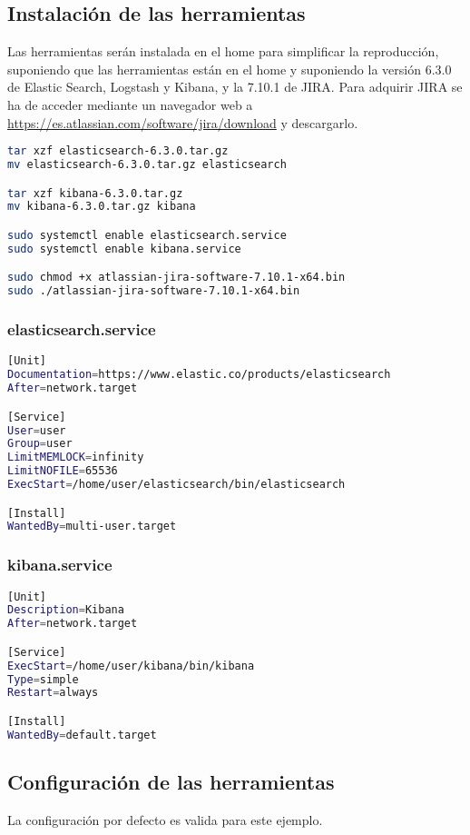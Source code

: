 \subsection{Instalación de las herramientas}
Las herramientas serán instalada en el home para simplificar la reproducción, suponiendo que las herramientas están en el home y suponiendo la versión 6.3.0 de Elastic Search, Logstash y Kibana, y la 7.10.1 de JIRA. Para adquirir JIRA se ha de acceder mediante un navegador web a \href{https://es.atlassian.com/software/jira/download}{https://es.atlassian.com/software/jira/download} y descargarlo.
\begin{lstlisting}[language=Bash]
tar xzf elasticsearch-6.3.0.tar.gz
mv elasticsearch-6.3.0.tar.gz elasticsearch

tar xzf kibana-6.3.0.tar.gz
mv kibana-6.3.0.tar.gz kibana

sudo systemctl enable elasticsearch.service
sudo systemctl enable kibana.service

sudo chmod +x atlassian-jira-software-7.10.1-x64.bin
sudo ./atlassian-jira-software-7.10.1-x64.bin
\end{lstlisting}

\subsubsection{elasticsearch.service}\label{cap:elasticsearch}
\begin{lstlisting}[language=Bash]
[Unit]
Documentation=https://www.elastic.co/products/elasticsearch
After=network.target

[Service]
User=user
Group=user
LimitMEMLOCK=infinity
LimitNOFILE=65536
ExecStart=/home/user/elasticsearch/bin/elasticsearch

[Install]
WantedBy=multi-user.target
\end{lstlisting}

\subsubsection{kibana.service}\label{cap:kibana}
\begin{lstlisting}[language=Bash]
[Unit]
Description=Kibana
After=network.target

[Service]
ExecStart=/home/user/kibana/bin/kibana
Type=simple
Restart=always

[Install]
WantedBy=default.target
\end{lstlisting}


\subsection{Configuración de las herramientas}
La configuración por defecto es valida para este ejemplo.






